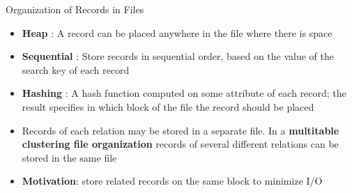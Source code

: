 \documentclass[aspectratio=169, xcolor=dvipsnames]{beamer}
\begin{document}
\begin{frame}{Organization of Records in Files}
    \begin{block}{}
        \begin{itemize}[<+->]
            \item \textbf{Heap} : A record can be placed anywhere in the file where there is space
            \item \textbf{Sequential} : Store records in sequential order, based on the value of the search key of each record
            \item \textbf{Hashing} : A hash function computed on some attribute of each record; the result specifies in which block of the file the record should be placed
            \item Records of each relation may be stored in a separate file. In a \textbf{multitable clustering file organization} records of several different relations can be stored in the same file
            \item \textbf{Motivation}: store related records on the same block to minimize I/O
        \end{itemize}
    \end{block}
\end{frame}
\end{document}
